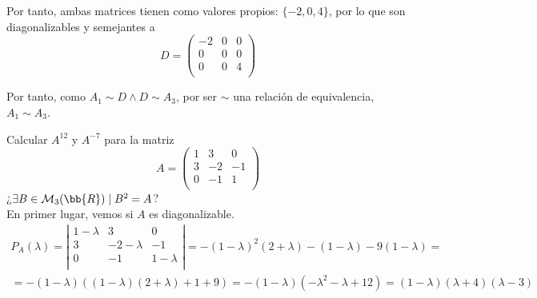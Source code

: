 \begin{ejercicio}
    Por tanto, ambas matrices tienen como valores propios: $\{-2,0,4\}$, por lo que son diagonalizables y semejantes a
        $$D = \left( \begin{array}{ccc}
            -2 & 0 & 0 \\
            0 & 0 & 0 \\
            0 & 0 & 4 \\
        \end{array}\right)$$

    Por tanto, como $A_1 \sim D \land D\sim A_3$, por ser $\sim$ una relación de equivalencia, $A_1 \sim A_3$.
\end{ejercicio}

\begin{ejercicio}
    Calcular $A^{12}$ y $A^{-7}$ para la matriz
    $$A = \left( \begin{array}{ccc}
            1 & 3 & 0 \\
            3 & -2 & -1 \\
            0 & -1 & 1 \\
        \end{array}\right)$$
        ¿$\exists B\in \mathcal{M}_3(\bb{R}) \mid B^2 = A$?\\

        En primer lugar, vemos si $A$ es diagonalizable.
        \begin{multline*}
            P_A(\lambda) = \left| \begin{array}{ccc}
                1-\lambda & 3 & 0 \\
                3 & -2-\lambda & -1 \\
                0 & -1 & 1-\lambda \\
            \end{array}\right|
            = -(1-\lambda)^2(2+\lambda)-(1-\lambda)-9(1-\lambda) = \\
            = -(1-\lambda)((1-\lambda)(2+\lambda)+1+9) = -(1-\lambda)(-\lambda^2-\lambda+12) = (1-\lambda)(\lambda+4)(\lambda-3)
        \end{multline*}


\end{ejercicio}
